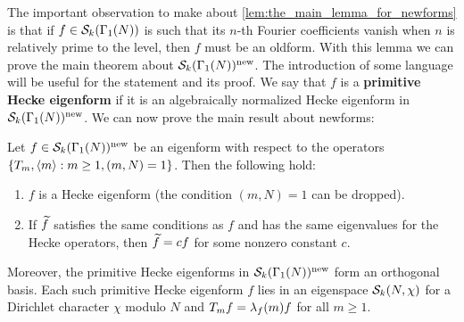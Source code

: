       The important observation to make about \cref{lem:the_main_lemma_for_newforms} is that if $f \in \mathcal{S}_{k}(\Gamma_{1}(N))$ is such that its $n$-th Fourier coefficients vanish when $n$ is relatively prime to the level, then $f$ must be an oldform. With this lemma we can prove the main theorem about $\mathcal{S}_{k}(\Gamma_{1}(N))^{\mathrm{new}}$. The introduction of some language will be useful for the statement and its proof. We say that $f$ is a \textbf{primitive Hecke eigenform} if it is an algebraically normalized Hecke eigenform in $\mathcal{S}_{k}(\Gamma_{1}(N))^{\mathrm{new}}$. We can now prove the main result about newforms:

      \begin{theorem}\label{thm:newforms_characterization}
        Let $f \in \mathcal{S}_{k}(\Gamma_{1}(N))^{\mathrm{new}}$ be an eigenform with respect to the operators $\{T_{m},\langle m\rangle:m \ge 1, (m,N) = 1\}$. Then the following hold:
        \begin{enumerate}[label=(\roman*)]
          \item $f$ is a Hecke eigenform (the condition $(m,N) = 1$ can be dropped).
          \item If $\widetilde{f}$ satisfies the same conditions as $f$ and has the same eigenvalues for the Hecke operators, then $\widetilde{f} = cf$ for some nonzero constant $c$.
        \end{enumerate}
        Moreover, the primitive Hecke eigenforms in $\mathcal{S}_{k}(\Gamma_{1}(N))^{\mathrm{new}}$ form an orthogonal basis. Each such primitive Hecke eigenform $f$ lies in an eigenspace $\mathcal{S}_{k}(N,\chi)$ for a Dirichlet character $\chi$ modulo $N$ and $T_{m}f = \lambda_{f}(m)f$ for all $m \ge 1$.
      \end{theorem}
